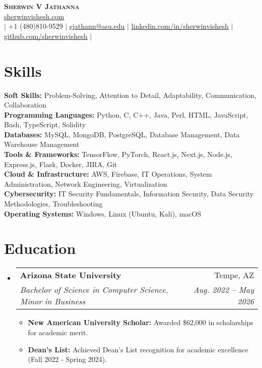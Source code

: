 \documentclass[letterpaper,11pt]{article}
\makeatletter
\newcommand{\resumeItem}[1]{
  \item\small{
    {#1 \vspace{-2pt}}
  }
}
\newcommand{\resumeSubheading}[4]{
  \vspace{-2pt}\item
    \begin{tabular*}{0.97\textwidth}[t]{l@{\extracolsep{\fill}}r}
      \textbf{#1} & #2 \\
      \textit{\small#3} & \textit{\small #4} \\
    \end{tabular*}\vspace{-7pt}
}
\newcommand{\resumeSubHeadingListStart}{\begin{itemize}[leftmargin=0.15in, label={}]}
\newcommand{\resumeSubHeadingListEnd}{\end{itemize}}
\newcommand{\resumeItemListStart}{\begin{itemize}}
\newcommand{\resumeItemListEnd}{\end{itemize}\vspace{-5pt}}
\makeatother
\begin{document}
\begin{center}
    \textbf{\Huge \scshape Sherwin V Jathanna} \\ \vspace{1pt}
     \href{https://sherwinvishesh.com}{\underline{sherwinvishesh.com}} 
   \\ \small $|$ +1 (480)810-9529 $|$ \href{mailto:sjathann@asu.edu}{\underline{sjathann@asu.edu}} $|$ 
    \href{https://linkedin.com/in/sherwinvishesh}{\underline{linkedin.com/in/sherwinvishesh}} $|$
    \href{https://github.com/sherwinvishesh}{\underline{github.com/sherwinvishesh}} $|$
\end{center}

\section{Skills}
 \begin{itemize}[leftmargin=0.15in, label={}]
    \small{\item{
    \textbf{Soft Skills:}{ Problem-Solving, Attention to Detail, Adaptability, Communication, Collaboration} \\
    \textbf{Programming Languages:}{ Python, C, C++, Java, Perl, HTML, JavaScript, Bash, TypeScript, Solidity} \\
    \textbf{Databases:}{ MySQL, MongoDB, PostgreSQL, Database Management, Data Warehouse Management} \\
    \textbf{Tools \& Frameworks:}{ TensorFlow, PyTorch, React.js, Next.js, Node.js, Express.js, Flask, Docker, JIRA, Git} \\
    \textbf{Cloud \& Infrastructure:}{ AWS, Firebase, IT Operations, System Administration, Network Engineering, Virtualization} \\
    \textbf{Cybersecurity:}{ IT Security Fundamentals, Information Security, Data Security Methodologies, Troubleshooting} \\
    \textbf{Operating Systems: }{ Windows, Linux (Ubuntu, Kali), macOS}
    }}
 \end{itemize}

\section{Education}
  \resumeSubHeadingListStart
    \resumeSubheading
      {Arizona State University}{Tempe, AZ}
      {Bachelor of Science in Computer Science, Minor in Business}{Aug. 2022 -- May 2026}
      \resumeItemListStart
        \resumeItem{\textbf{New American University Scholar:} Awarded \$62,000 in scholarships for academic merit.}
        \resumeItem{\textbf{Dean’s List:} Achieved Dean’s List recognition for academic excellence (Fall 2022 - Spring 2024).}
      \resumeItemListEnd
  \resumeSubHeadingListEnd
\end{document}
